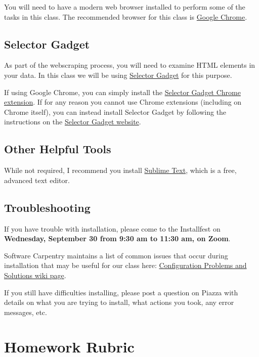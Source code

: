 \documentclass[]{book}
\begin{document}
You will need to have a modern web browser installed to perform some of
the tasks in this class. The recommended browser for this class is
\href{https://www.google.co.uk/intl/en_uk/chrome/}{Google Chrome}.

\section{Selector Gadget}\label{selector-gadget}

As part of the webscraping process, you will need to examine HTML
elements in your data. In this class we will be using
\href{https://selectorgadget.com/}{Selector Gadget} for this purpose.

If using Google Chrome, you can simply install the
\href{https://chrome.google.com/webstore/detail/selectorgadget/mhjhnkcfbdhnjickkkdbjoemdmbfginb?hl=en}{Selector
Gadget Chrome extension}. If for any reason you cannot use Chrome
extensions (including on Chrome itself), you can instead install
Selector Gadget by following the instructions on the
\href{https://selectorgadget.com/}{Selector Gadget website}.

\section{Other Helpful Tools}\label{other-helpful-tools}

While not required, I recommend you install
\href{https://www.sublimetext.com/3}{Sublime Text}, which is a free,
advanced text editor.

\section{Troubleshooting}\label{troubleshooting}

If you have trouble with installation, please come to the Installfest on
\textbf{Wednesday, September 30 from 9:30 am to 11:30 am, on Zoom}.

Software Carpentry maintains a list of common issues that occur during
installation that may be useful for our class here:
\href{https://github.com/swcarpentry/workshop-template/wiki/Configuration-Problems-and-Solutions}{Configuration
Problems and Solutions wiki page}.

If you still have difficulties installing, please post a question on
Piazza with details on what you are trying to install, what actions you
took, any error messages, etc.

\chapter{Homework Rubric}\label{homework-rubric}
\end{document}
